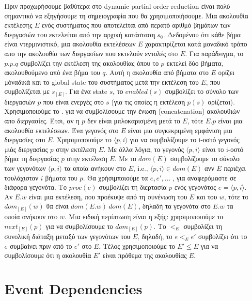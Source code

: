 Πριν προχωρήσουμε βαθύτερα στο dynamic partial order reduction είναι πολύ σημαντικό να εξηγήσουμε τη σημειογραφία που θα χρησιμοποιήσουμε.
Μια ακολουθία εκτέλεσης $E$ ενός συστήματος που αποτελείται από περατό αριθμό βημάτων των διεργασιών του εκτελείται από την αρχική κατάσταση 
$s_0$. Δεδομένου ότι κάθε βήμα είναι ντερμινιστικό, μια ακολουθία εκτελέσεων $E$ χαρακτιρίζεται κατά μοναδικό τρόπο απο την ακολουθία των διεργασίων που εκτελούν εντολές στο $E$.
Για παράδειγμα, το $p.p.q$ συμβολίζει την εκτέλεση της ακολουθίας όπου το $p$ εκτελεί δύο βήματα, ακολουθούμενο από ένα βήμα του $q$.
Αυτή η ακολουθία από βήματα στο $E$ ορίζει μόναδικά και το global state του συστήματος μετά την εκτέλεση του $E$, που συμβολίζεται με $s_{[E]}$. 
Για ένα state $s$, το $enabled(s)$ συμβολίζει το σύνολο των διεργασιών $p$ 
που είναι ενεργές στο $s$ (για τις οποίες η εκτέλεση $p(s)$ ορίζεται). Χρησιμοποιούμε το $.$ για να συμβολίσουμε την ένωση (concatenation) ακολουθιών απο διεργασίες.
Έτσι, αν η $p$ δεν είναι μπλοκαρισμένη μετά το $E$, τότε $E.p$ είναι μια ακολουθία εκτελέσεων.
Ένα γεγονός στο $E$ είναι μια συγκεκριμένη εμφάνιση μια διεργασίες στο $E$.
Χρησιμοποιούμε το $\langle p,i \rangle$ για να συμβολίζουμε το i-οστό γεγονός μιάς διεργασίας $p$ στην εκτέλεση $E$. 
Με άλλα λόγια, το γεγονός $\langle p,i \rangle$ είναι το i-οστό βήμα τη διεργασίας $p$ στην εκτέλεση $E$. 
Με το $dom(E)$ συμβολίζουμε το σύνολο των γεγονότων $\langle p,i \rangle$ τα οποία ανήκουν στο $E$, i.e., $\langle p,i \rangle \in dom(E)$ ανν $E$
περιέχει τουλάχιστον $i$ βήματα του $p$. Θα χρήσιμποιούμε τα $e,e',...$ , για αναφερόμαστε σε διάφορα γεγονότα. 
Το $proc(e)$ συμβολίζει τη διερτασία $p$ ενός γεγονότος $e = \langle p, i \rangle$.
Αν $E.w$ είναι μια εκτέλεση, που προέκυψε από τη συνένωση του $E$ και του
$w$, τότε το $dom_{[E]}(w)$ θα είναι $dom(E.w) \ dom(E)$, δηλαδή τα γεγονότα στο
$E.w$ τα οποία ανήκουν στο $w$. Μια ειδική περίπτωση είναι η εξής: χρησιμοποιούμε το  $next_{[E]}(p)$ για να συμβολίσουμε το
$dom_{[E]}(p)$.
Το $<_E$ συμβολίζει τη συνολική διάταξη μεταξύ των γεγονότων του $E$, δηλαδή, το
$e <_E e'$ συμβολίζει ότι το  $e$ συμβαίνει πριν από το $e'$ στο $E$. Τέλος
χρησιμοποιούμε το $E'\leq E$ για να συμβολίσουμε ότι η ακολουθία $E'$ είναι
πρόθεμα της ακολουθίας $E$.

\section{Event Dependencies}

